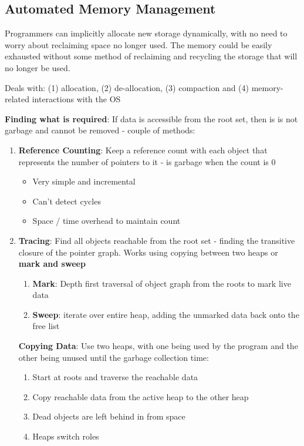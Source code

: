\documentclass{article}
\newenvironment{pros}{\par\color[rgb]{0.066, 0.4, 0.129}}{\par}
\newenvironment{cons}{\par\color{red}}{\par}
\begin{document}
\subsection{Automated Memory Management}
Programmers can implicitly allocate new storage dynamically, with no need to worry about reclaiming space no longer used. The memory could be easily exhausted without some method of reclaiming and recycling the storage that will no longer be used.

Deals with: (1) allocation, (2) de-allocation, (3) compaction and (4) memory-related interactions with the OS

\bigskip
\noindent
\textbf{Finding what is required}: If data is accessible from the root set, then is is not garbage and cannot be removed - couple of methods:
\begin{enumerate}
	\item \textbf{Reference Counting}: Keep a reference count with each object that represents the number of pointers to it - is garbage when the count is 0
	\begin{itemize}
	\begin{pros}
		\item Very simple and incremental
	\end{pros}
	\begin{cons}
		\item Can't detect cycles
		\item Space / time overhead to maintain count
	\end{cons}
	\end{itemize}
	
	\item \textbf{Tracing}: Find all objects reachable from the root set - finding the transitive closure of the pointer graph. Works using copying between two heaps or \textbf{mark and sweep}
	\begin{enumerate}
		\item \textbf{Mark}: Depth first traversal of object graph from the roots to mark live data
		\item \textbf{Sweep}: iterate over entire heap, adding the unmarked data back onto the free list
	\end{enumerate}

	\textbf{Copying Data}:
	Use two heaps, with one being used by the program and the other being unused until the garbage collection time:
	\begin{enumerate}
		\item Start at roots and traverse the reachable data
		\item Copy reachable data from the active heap to the other heap
		\item Dead objects are left behind in from space
		\item Heaps switch roles
	\end{enumerate}
\end{enumerate}
\end{document}
